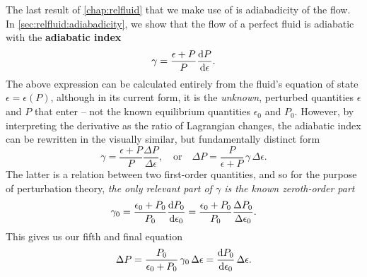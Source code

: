 The last result of \cref{chap:relfluid} that we make use of is adiabadicity of the flow.
In \cref{sec:relfluid:adiabadicity}, we show that the flow of a perfect fluid is adiabatic with the \textbf{adiabatic index}
\begin{equation}
	\gamma = \frac{\epsilon+P}{P} \odv{P}{\epsilon} .
\label{eq:nstars:adiabatic_index0}
\end{equation}
The above expression can be calculated entirely from the fluid's equation of state $\epsilon = \epsilon(P)$, although in its current form, it is the \emph{unknown}, perturbed quantities $\epsilon$ and $P$ that enter -- not the known equilibrium quantities $\epsilon_0$ and $P_0$.
However, by interpreting the derivative as the ratio of Lagrangian changes, the adiabatic index can be rewritten in the visually similar, but fundamentally distinct form
\begin{equation}
	\gamma = 
	\frac{\epsilon+P}{P} \frac{\Delta P}{\Delta \epsilon} ,
	\quad \text{or} \quad
	\Delta P = \frac{P}{\epsilon + P} \, \gamma \, \Delta \epsilon .
\label{eq:nstars:adiabatic_index}
\end{equation}
The latter is a relation between two first-order quantities, and so for the purpose of perturbation theory, \emph{the only relevant part of $\gamma$ is the known zeroth-order part}
\begin{equation}
	\gamma_0 = \frac{\epsilon_0+P_0}{P_0} \odv{P_0}{\epsilon_0}
	         = \frac{\epsilon_0+P_0}{P_0} \frac{\Delta P_0}{\Delta \epsilon_0} .
\end{equation}
This gives us our fifth and final equation
\begin{equation}
	\Delta P = \frac{P_0}{\epsilon_0 + P_0} \, \gamma_0 \, \Delta \epsilon
	         = \odv{P_0}{\epsilon_0} \, \Delta\epsilon .
\label{eq:nstars:Delta_P}
\end{equation}

